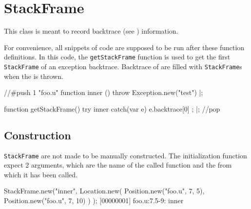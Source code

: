 
\section{StackFrame}

This class is meant to record backtrace (see )
information.

For convenience, all snippets of code are supposed to be run after these
function definitions.  In this code, the \lstinline|getStackFrame| function
is used to get the first \lstinline|StackFrame| of an exception backtrace.
Backtrace of  are filled with \lstinline|StackFrame|s
when the is thrown.

\begin{urbiscript}
//#push 1 "foo.u"
function inner () { throw Exception.new("test") }|;

function getStackFrame()
{
  try
  {
    inner
  }
  catch(var e)
  {
    e.backtrace[0]
  };
}|;
//pop
\end{urbiscript}

\experimental{}


\subsection{Construction}

\lstinline|StackFrame| are not made to be manually constructed.  The
initialization function expect 2 arguments, which are the name of the called
function and the  from which it has been called.

\begin{urbiscript}
StackFrame.new("inner",
  Location.new(
    Position.new("foo.u", 7, 5),
    Position.new("foo.u", 7, 10)
  )
);
[00000001] foo.u:7.5-9: inner
\end{urbiscript}

